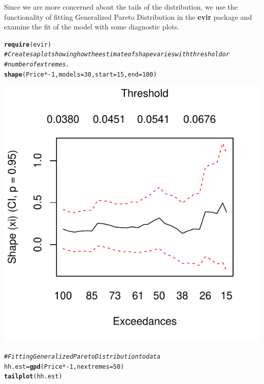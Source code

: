 \documentclass[10pt]{article}\usepackage[]{graphicx}\usepackage[]{color}
\makeatletter
\def\maxwidth{ %
  \ifdim\Gin@nat@width>\linewidth
    \linewidth
  \else
    \Gin@nat@width
  \fi
}
\newcommand{\hlnum}[1]{\textcolor[rgb]{0.686,0.059,0.569}{#1}}%
\newcommand{\hlcom}[1]{\textcolor[rgb]{0.678,0.584,0.686}{\textit{#1}}}%
\newcommand{\hlopt}[1]{\textcolor[rgb]{0,0,0}{#1}}%
\newcommand{\hlstd}[1]{\textcolor[rgb]{0.345,0.345,0.345}{#1}}%
\newcommand{\hlkwb}[1]{\textcolor[rgb]{0.69,0.353,0.396}{#1}}%
\newcommand{\hlkwc}[1]{\textcolor[rgb]{0.333,0.667,0.333}{#1}}%
\newcommand{\hlkwd}[1]{\textcolor[rgb]{0.737,0.353,0.396}{\textbf{#1}}}%
\newenvironment{kframe}{%
 \def\at@end@of@kframe{}%
 \ifinner\ifhmode%
  \def\at@end@of@kframe{\end{minipage}}%
  \begin{minipage}{\columnwidth}%
 \fi\fi%
 \def\FrameCommand##1{\hskip\@totalleftmargin \hskip-\fboxsep
 \colorbox{shadecolor}{##1}\hskip-\fboxsep
     \hskip-\linewidth \hskip-\@totalleftmargin \hskip\columnwidth}%
 \MakeFramed {\advance\hsize-\width
   \@totalleftmargin\z@ \linewidth\hsize
   \@setminipage}}%
 {\par\unskip\endMakeFramed%
 \at@end@of@kframe}
\newenvironment{knitrout}{}{} %
\makeatother
\begin{document}
Since we are more concerned about the tails of the distribution, we use the functionality of fitting Generalized Pareto Distribution in the \textbf{evir} package and examine the fit of the model with some diagnostic plots.
\begin{knitrout}
\color{fgcolor}\begin{kframe}
\begin{alltt}
\hlkwd{require}\hlstd{(evir)}
\hlcom{# Creates a plot showing how the estimate of shape varies with threshold or}
\hlcom{# number of extremes.}
\hlkwd{shape}\hlstd{(Price} \hlopt{* -}\hlnum{1}\hlstd{,} \hlkwc{models} \hlstd{=} \hlnum{30}\hlstd{,} \hlkwc{start} \hlstd{=} \hlnum{15}\hlstd{,} \hlkwc{end} \hlstd{=} \hlnum{100}\hlstd{)}
\end{alltt}
\end{kframe}

{\centering \includegraphics[width=\maxwidth]{figure/unnamed-chunk-51} 

}


\begin{kframe}\begin{alltt}
\hlcom{# Fitting Generalized Pareto Distribution to data}
\hlstd{hh.est} \hlkwb{=} \hlkwd{gpd}\hlstd{(Price} \hlopt{* -}\hlnum{1}\hlstd{,} \hlkwc{nextremes} \hlstd{=} \hlnum{50}\hlstd{)}
\hlkwd{tailplot}\hlstd{(hh.est)}
\end{alltt}
\end{kframe}


\end{knitrout}
\end{document}
